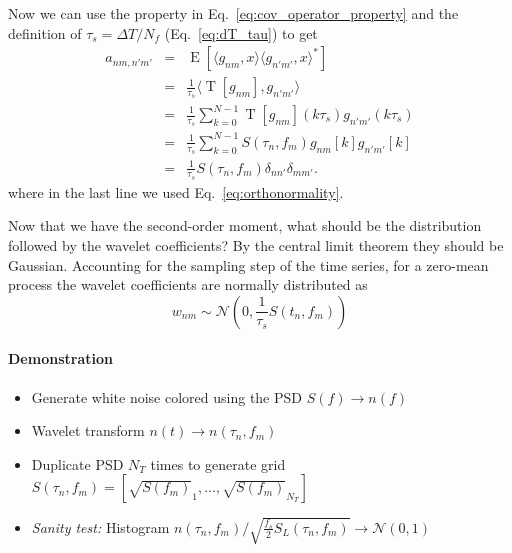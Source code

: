 \documentclass{article}
\begin{document}
Now we can use the property in Eq.~\eqref{eq:cov_operator_property} and the definition of $\tau_s = \Delta T / N_f$ (Eq.~\eqref{eq:dT_tau}) to get 
\begin{eqnarray}
\label{eq:cov_operator_property-applied}
    a_{nm, n'm'} &=&  \operatorname{E}\left[ \langle g_{nm} , x \rangle \langle g_{n'm'}, x \rangle^{\ast} \right] \nonumber \\
    & = & \frac{1}{\tau_s} \langle \operatorname{T}[g_{nm}], g_{n'm'} \rangle \nonumber \\
    & = & \frac{1}{\tau_s} \sum_{k=0}^{N-1} \operatorname{T}[g_{nm}](k \tau_s) g_{n'm'}(k \tau_s) \nonumber \\
    & = & \frac{1}{\tau_s} \sum_{k=0}^{N-1} S(\tau_n, f_m) g_{nm}[k] g_{n'm'}[k] \nonumber \\
    & = & \frac{1}{\tau_s} S(\tau_n, f_m) \delta_{n n'} \delta_{mm'}.
\end{eqnarray}
where in the last line we used Eq.~\eqref{eq:orthonormality}.

Now that we have the second-order moment, what should be the distribution followed by the wavelet coefficients? By the central limit theorem they should be Gaussian. Accounting for the sampling step of the time series, for a zero-mean process the wavelet coefficients are normally distributed as
\begin{equation}
    w_{nm} \sim \mathcal{N}\left(0, \frac{1}{\tau_s} S(t_n, f_m) \right)
\end{equation}

\paragraph{Demonstration}

\begin{itemize}
    \item Generate white noise colored using the PSD $S(f)\rightarrow n(f)$
    \item Wavelet transform $n(t)\rightarrow n(\tau_n,f_m)$
    \item Duplicate PSD $N_T$ times to generate grid $S(\tau_n, f_m)=  [\sqrt{S(f_m)}_1, \dots,  \sqrt{S(f_m)}_{N_T}]$
    \item \textit{Sanity test:} Histogram $n(\tau_n,f_m)/\sqrt{\frac{f_s}{2}S_L(\tau_n, f_m)} \rightarrow \mathcal{N}(0,1) $
\end{itemize}
\end{document}
